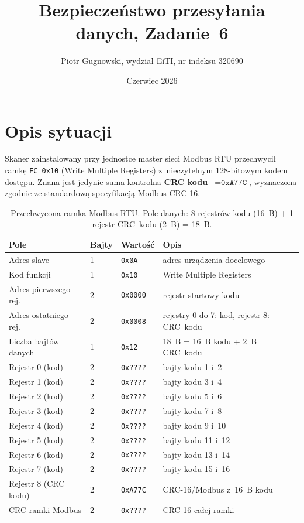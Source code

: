 \documentclass[12pt,a4paper]{article}
\title{Bezpiecze\'nstwo przesy{\l}ania danych, Zadanie~6}
\author{Piotr Gugnowski, wydzia{\l} EiTI, nr indeksu 320690}
\date{Czerwiec 2026}
\begin{document}
\maketitle

\section*{Opis sytuacji}

Skaner zainstalowany przy jednostce master sieci Modbus RTU przechwycił
ramkę \texttt{FC~0x10} (Write Multiple Registers) z~nieczytelnym 128-bitowym
kodem dostępu. Znana jest jedynie suma kontrolna \textbf{CRC kodu~$= \texttt{0xA77C}$},
wyznaczona zgodnie ze standardową specyfikacją Modbus CRC-16.

\begin{table}[H]
\centering
\begin{tabular}{llll}
\toprule
\textbf{Pole} & \textbf{Bajty} & \textbf{Wartość} & \textbf{Opis} \\
\midrule
Adres slave              & 1 & \texttt{0x0A}   & adres urządzenia docelowego \\
Kod funkcji              & 1 & \texttt{0x10}   & Write Multiple Registers \\
Adres pierwszego rej.    & 2 & \texttt{0x0000} & rejestr startowy kodu \\
Adres ostatniego rej.    & 2 & \texttt{0x0008} & rejestry 0 do 7: kod, rejestr 8: CRC~kodu \\
Liczba bajtów danych     & 1 & \texttt{0x12}   & 18~B = 16~B kodu + 2~B CRC~kodu \\
\midrule
Rejestr 0 (kod)          & 2 & \texttt{0x????} & bajty kodu 1 i~2 \\
Rejestr 1 (kod)          & 2 & \texttt{0x????} & bajty kodu 3 i~4 \\
Rejestr 2 (kod)          & 2 & \texttt{0x????} & bajty kodu 5 i~6 \\
Rejestr 3 (kod)          & 2 & \texttt{0x????} & bajty kodu 7 i~8 \\
Rejestr 4 (kod)          & 2 & \texttt{0x????} & bajty kodu 9 i~10 \\
Rejestr 5 (kod)          & 2 & \texttt{0x????} & bajty kodu 11 i~12 \\
Rejestr 6 (kod)          & 2 & \texttt{0x????} & bajty kodu 13 i~14 \\
Rejestr 7 (kod)          & 2 & \texttt{0x????} & bajty kodu 15 i~16 \\
\midrule
Rejestr 8 (CRC kodu)     & 2 & \texttt{0xA77C} & CRC-16/Modbus z~16~B kodu \\
\midrule
CRC ramki Modbus         & 2 & \texttt{0x????} & CRC-16 całej ramki \\
\bottomrule
\end{tabular}
\caption{Przechwycona ramka Modbus RTU. Pole danych: 8 rejestrów kodu
         (16~B) + 1 rejestr CRC~kodu (2~B) = 18~B.}
\end{table}
\end{document}
